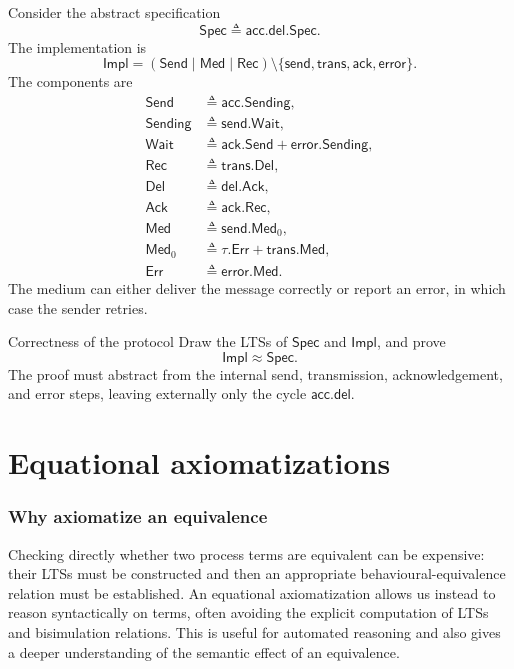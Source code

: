 \documentclass[a4paper]{article}
\begin{document}
Consider the abstract specification
\[
    \mathsf{Spec}
    \triangleq
    \mathsf{acc}.\mathsf{del}.\mathsf{Spec}.
\]
The implementation is
\[
    \mathsf{Impl}
    =
    (\mathsf{Send}\mid\mathsf{Med}\mid\mathsf{Rec})
    \setminus
    \{\mathsf{send},\mathsf{trans},\mathsf{ack},\mathsf{error}\}.
\]
The components are
\begin{align*}
    \mathsf{Send}&\triangleq\mathsf{acc}.\mathsf{Sending},\\
    \mathsf{Sending}&\triangleq\mathsf{send}.\mathsf{Wait},\\
    \mathsf{Wait}&\triangleq
        \mathsf{ack}.\mathsf{Send}
        +
        \mathsf{error}.\mathsf{Sending},\\
    \mathsf{Rec}&\triangleq\mathsf{trans}.\mathsf{Del},\\
    \mathsf{Del}&\triangleq\mathsf{del}.\mathsf{Ack},\\
    \mathsf{Ack}&\triangleq\mathsf{ack}.\mathsf{Rec},\\
    \mathsf{Med}&\triangleq\mathsf{send}.\mathsf{Med}_0,\\
    \mathsf{Med}_0&\triangleq
        \tau.\mathsf{Err}
        +
        \mathsf{trans}.\mathsf{Med},\\
    \mathsf{Err}&\triangleq\mathsf{error}.\mathsf{Med}.
\end{align*}
The medium can either deliver the message correctly or report an error, in which case the sender retries.

\begin{snippetexercise}{Correctness of the protocol}
    Draw the LTSs of \(\mathsf{Spec}\) and \(\mathsf{Impl}\), and prove
    \[
        \mathsf{Impl}\approx\mathsf{Spec}.
    \]
    The proof must abstract from the internal send, transmission, acknowledgement, and error steps, leaving externally only the cycle \(\mathsf{acc}.\mathsf{del}\).
\end{snippetexercise}

\pagebreak
\part{Equational axiomatizations}

\section{Why axiomatize an equivalence}

Checking directly whether two process terms are equivalent can be expensive: their LTSs must be constructed and then an appropriate behavioural-equivalence relation must be established.
An equational axiomatization allows us instead to reason syntactically on terms, often avoiding the explicit computation of LTSs and bisimulation relations.
This is useful for automated reasoning and also gives a deeper understanding of the semantic effect of an equivalence.
\end{document}
